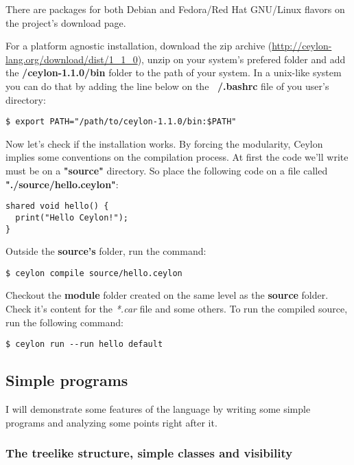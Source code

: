 There are packages for both Debian and Fedora/Red Hat GNU/Linux flavors on the
project's download page\cite{1_10}.

For a platform agnostic installation, download the zip archive
(\url{http://ceylon-lang.org/download/dist/1_1_0}),
unzip on your system's prefered folder and add the \textbf{/ceylon-1.1.0/bin}
folder to the path of your system. In a unix-like system you can do that by
adding the line below on the \textbf{~/.bashrc} file of you user's directory:

\begin{verbatim}
$ export PATH="/path/to/ceylon-1.1.0/bin:$PATH"
\end{verbatim}

Now let's check if the installation works. By forcing the modularity, Ceylon
implies some conventions on the compilation process. At first the code we'll
write must be on a \textbf{"source"} directory. So place the following code on a
file called \textbf{"./source/hello.ceylon"}:

\begin{lstlisting}[label=hello,caption=Ceylon Hello World]
shared void hello() {
  print("Hello Ceylon!");
}
\end{lstlisting}

Outside the \textbf{source's} folder, run the command:

\begin{verbatim}
$ ceylon compile source/hello.ceylon
\end{verbatim}

Checkout the \textbf{module} folder created on the same level as the 
\textbf{source} folder. Check it's content for the \textit{*.car} file and some
others. To run the compiled source, run the following command:

\begin{verbatim}
$ ceylon run --run hello default
\end{verbatim}

\subsection{Simple programs}

I will demonstrate some features of the language by writing some simple programs
and analyzing some points right after it.

\subsubsection{The treelike structure, simple classes and visibility}

